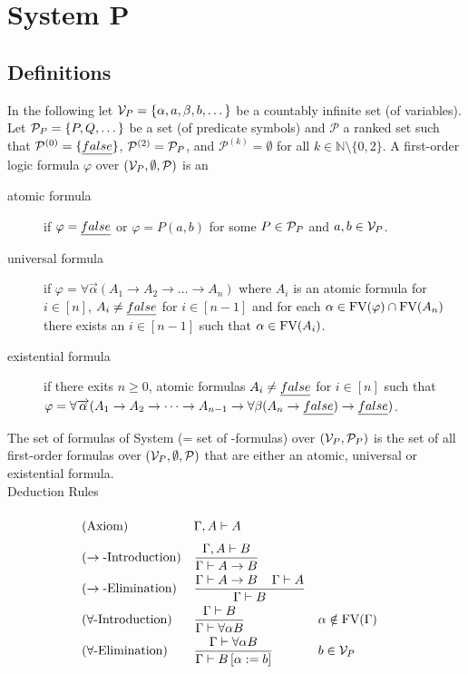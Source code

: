 \section{System P}
\subsection{Definitions}
In the following let $\mathcal{V}_P=\{\alpha,a,\beta,b,\dots\}$ be a countably infinite set (of variables). 
Let $\mathcal{P}_P=\{P,Q,\dots\}$ be a set (of predicate symbols) and $\mathcal{P}$ a ranked set such that $\mathcal{P}^{(0)}=\{\emph{false}\}$, $\mathcal{P}^{(2)}=\mathcal{P}_P$, and $\mathcal{P}^{(k)}=\emptyset$ for all $k\in\mathbb{N}\setminus\{0,2\}$.
A first-order logic formula $\varphi$ over $(\mathcal{V}_P,\emptyset,\mathcal{P})$ is an 
\begin{description} %
	\item[atomic formula] if $\varphi=\emph{false}$ or $\varphi=P(a,b)$ for some $P\in\mathcal{P}_P$ and $a,b\in\mathcal{V}_P$.
	\item[universal formula] if $\varphi=\forall\overrightarrow{\alpha}(A_1\to A_2 \to\dots\to A_n)$ where $A_i$ is an atomic formula for $i\in\left[n\right]$, $A_i\neq\emph{false}$ for $i\in\left[n-1\right]$ and for each $\alpha\in\text{FV}(\varphi)\cap\text{FV}(A_n)$ there exists an $i\in\left[n-1\right]$ such that $\alpha\in\text{FV}(A_i)$.
	\item[existential formula] if there exits $n\ge0$,  atomic formulas $A_i\neq\emph{false}$ for $i\in\left[n\right]$ such that $\varphi=\forall\overrightarrow{\alpha}(A_1\to A_2 \to\dots\to A_{n-1}\to\forall\beta(A_n\to\emph{false})\to\emph{false})$.
\end{description}
The set of formulas of System \SysP{} (= set of \SysP-formulas) over $(\mathcal{V}_P,\mathcal{P}_P)$ is the set of all first-order formulas over $(\mathcal{V}_P,\emptyset,\mathcal{P})$ that are either an atomic, universal or existential formula.\\ 
Deduction Rules
\begin{mdframed}
	\begingroup%
	\addtolength{\jot}{0.3cm}
	\begin{align*}
		&(\text{Axiom}) &&\Gamma,A\vdash A\vphantom{\frac{\Gamma}{\Gamma}}\\
		&(\rightarrow\text{-Introduction}) &&\frac{\Gamma,A\vdash B}{\Gamma\vdash A\to B}\\
		&(\rightarrow\text{-Elimination}) &&\frac{\Gamma\vdash A\to B \hspace{0.4cm}\Gamma\vdash A}{\Gamma\vdash B}\\
		  & (\forall\text{-Introduction}) &   & \frac{\Gamma\vdash B}{\Gamma\vdash \forall\alpha B} &   & \alpha\notin\FV(\Gamma) \\
		&(\forall\text{-Elimination}) &&\frac{\Gamma\vdash \forall\alpha B }{\Gamma\vdash B\left[ \alpha:=b\right] }
		&& b\in\VarP %
	\end{align*}
	\endgroup
\end{mdframed}
